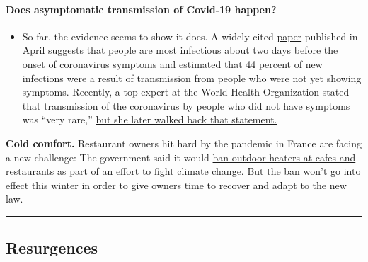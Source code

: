\begin{itemize}
{  \paragraph{Does asymptomatic transmission of Covid-19
  happen?}\label{does-asymptomatic-transmission-of-covid-19-happen}}

  \begin{itemize}
  \tightlist
  \item
    So far, the evidence seems to show it does. A widely cited
    \href{https://www.nature.com/articles/s41591-020-0869-5}{paper}
    published in April suggests that people are most infectious about
    two days before the onset of coronavirus symptoms and estimated that
    44 percent of new infections were a result of transmission from
    people who were not yet showing symptoms. Recently, a top expert at
    the World Health Organization stated that transmission of the
    coronavirus by people who did not have symptoms was ``very rare,''
    \href{https://www.nytimes3xbfgragh.onion/2020/06/09/world/coronavirus-updates.html?action=click\&pgtype=Article\&state=default\&region=MAIN_CONTENT_3\&context=storylines_faq\#link-1f302e21}{but
    she later walked back that statement.}
  \end{itemize}
\end{itemize}

\textbf{Cold comfort.} Restaurant owners hit hard by the pandemic in
France are facing a new challenge: The government said it would
\href{https://www.nytimes3xbfgragh.onion/2020/07/28/world/europe/france-heated-terraces-coronavirus.html}{ban
outdoor heaters at cafes and restaurants} as part of an effort to fight
climate change. But the ban won't go into effect this winter in order to
give owners time to recover and adapt to the new law.

\begin{center}\rule{0.5\linewidth}{\linethickness}\end{center}

\hypertarget{resurgences}{%
\subsection{Resurgences}\label{resurgences}}

